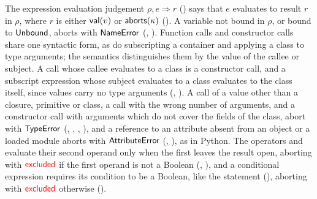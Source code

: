 The expression evaluation judgement $\rho, e \Rightarrow r$ () says that $e$ evaluates to
result $r$ in $\rho$, where $r$ is either $\mathsf{val}(v)$ or $\mathsf{aborts}(\kappa)$ (). A variable
not bound in $\rho$, or bound to $\mathsf{Unbound}$, aborts with $\mathsf{NameError}$ (,
). Function calls and constructor calls share one syntactic form, as do subscripting a container and applying a class to
type arguments; the semantics distinguishes them by the value of the callee or subject. A call whose
callee evaluates to a class is a constructor call, and a subscript expression whose subject evaluates to a class evaluates to the
class itself, since values carry no type arguments (, ). A call of a value other than a closure, primitive or class, a call with the wrong number
of arguments, and a constructor call with arguments which do not cover the fields of the class, abort with
$\mathsf{TypeError}$ (, , ,
), and a reference to an attribute absent from an object or a loaded module aborts with $\mathsf{AttributeError}$
(, ), as in Python. The operators
 and  evaluate their second operand only when the first leaves the result open, aborting with $\textcolor{red}{\mathsf{excluded}}$ if the first operand is
not a Boolean (, ), and
a conditional expression requires its condition to be a Boolean, like the
 statement (), aborting with $\textcolor{red}{\mathsf{excluded}}$ otherwise
().

